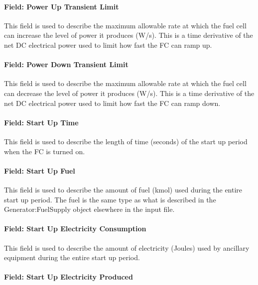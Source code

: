 \paragraph{Field: Power Up Transient Limit}\label{field-power-up-transient-limit}

This field is used to describe the maximum allowable rate at which the fuel cell can increase the level of power it produces (W/s). This is a time derivative of the net DC electrical power used to limit how fast the FC can ramp up.

\paragraph{Field: Power Down Transient Limit}\label{field-power-down-transient-limit}

This field is used to describe the maximum allowable rate at which the fuel cell can decrease the level of power it produces (W/s). This is a time derivative of the net DC electrical power used to limit how fast the FC can ramp down.

\paragraph{Field: Start Up Time}\label{field-start-up-time}

This field is used to describe the length of time (seconds) of the start up period when the FC is turned on.

\paragraph{Field: Start Up Fuel}\label{field-start-up-fuel}

This field is used to describe the amount of fuel (kmol) used during the entire start up period. The fuel is the same type as what is described in the Generator:FuelSupply object elsewhere in the input file.

\paragraph{Field: Start Up Electricity Consumption}\label{field-start-up-electricity-consumption}

This field is used to describe the amount of electricity (Joules) used by ancillary equipment during the entire start up period.

\paragraph{Field: Start Up Electricity Produced}\label{field-start-up-electricity-produced}

